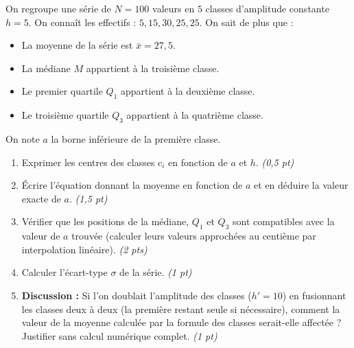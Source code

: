 \documentclass[11pt]{article}
\begin{document}
\begin{exercice}
On regroupe une série de $N=100$ valeurs en $5$ classes d'amplitude constante $h=5$. On connaît les effectifs : $5, 15, 30, 25, 25$. On sait de plus que :
\begin{itemize}
    \item La moyenne de la série est $\bar{x} = 27,5$.
    \item La médiane $M$ appartient à la troisième classe.
    \item Le premier quartile $Q_1$ appartient à la deuxième classe.
    \item Le troisième quartile $Q_3$ appartient à la quatrième classe.
\end{itemize}
On note $a$ la borne inférieure de la première classe.

\begin{enumerate}
    \item Exprimer les centres des classes $c_i$ en fonction de $a$ et $h$. \textit{(0,5 pt)}
    \item Écrire l'équation donnant la moyenne en fonction de $a$ et en déduire la valeur exacte de $a$. \textit{(1,5 pt)}
    \item Vérifier que les positions de la médiane, $Q_1$ et $Q_3$ sont compatibles avec la valeur de $a$ trouvée (calculer leurs valeurs approchées au centième par interpolation linéaire). \textit{(2 pts)}
    \item Calculer l'écart-type $\sigma$ de la série. \textit{(1 pt)}
    \item \textbf{Discussion :} Si l'on doublait l'amplitude des classes ($h' = 10$) en fusionnant les classes deux à deux (la première restant seule si nécessaire), comment la valeur de la moyenne calculée par la formule des classes serait-elle affectée ? Justifier sans calcul numérique complet. \textit{(1 pt)}
\end{enumerate}
\end{exercice}
\end{document}
